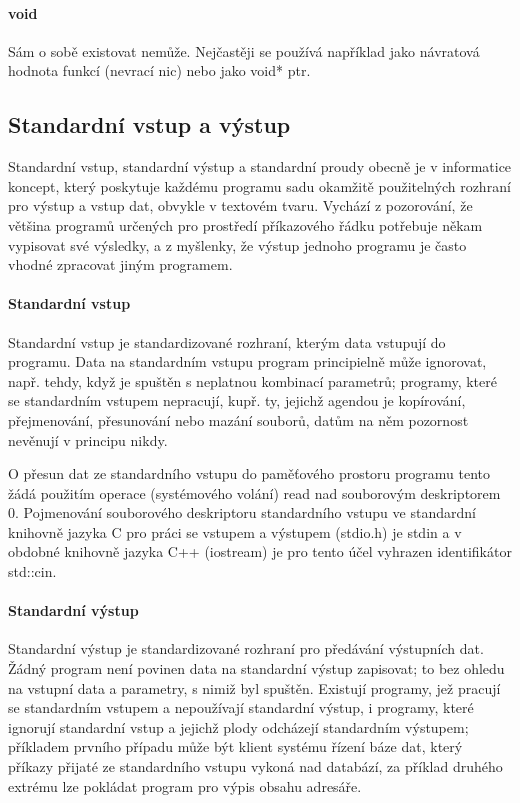 \paragraph{void}
Sám o sobě existovat nemůže. Nejčastěji se používá například jako návratová hodnota funkcí (nevrací nic) nebo jako void* ptr.
\subsection{Standardní vstup a výstup}
Standardní vstup, standardní výstup a standardní proudy obecně je v informatice koncept, který poskytuje každému programu sadu okamžitě použitelných rozhraní pro výstup a vstup dat, obvykle v textovém tvaru. Vychází z pozorování, že většina programů určených pro prostředí příkazového řádku potřebuje někam vypisovat své výsledky, a z myšlenky, že výstup jednoho programu je často vhodné zpracovat jiným programem.

\paragraph{Standardní vstup}
Standardní vstup je standardizované rozhraní, kterým data vstupují do programu. Data na standardním vstupu program principielně může ignorovat, např. tehdy, když je spuštěn s neplatnou kombinací parametrů; programy, které se standardním vstupem nepracují, kupř. ty, jejichž agendou je kopírování, přejmenování, přesunování nebo mazání souborů, datům na něm pozornost nevěnují v principu nikdy.

O přesun dat ze standardního vstupu do paměťového prostoru programu tento žádá použitím operace (systémového volání) read nad souborovým deskriptorem 0. Pojmenování souborového deskriptoru standardního vstupu ve standardní knihovně jazyka C pro práci se vstupem a výstupem (stdio.h) je stdin a v obdobné knihovně jazyka C++ (iostream) je pro tento účel vyhrazen identifikátor std::cin.
\paragraph{Standardní výstup}
Standardní výstup je standardizované rozhraní pro předávání výstupních dat. Žádný program není povinen data na standardní výstup zapisovat; to bez ohledu na vstupní data a parametry, s nimiž byl spuštěn. Existují programy, jež pracují se standardním vstupem a nepoužívají standardní výstup, i programy, které ignorují standardní vstup a jejichž plody odcházejí standardním výstupem; příkladem prvního případu může být klient systému řízení báze dat, který příkazy přijaté ze standardního vstupu vykoná nad databází, za příklad druhého extrému lze pokládat program pro výpis obsahu adresáře.

